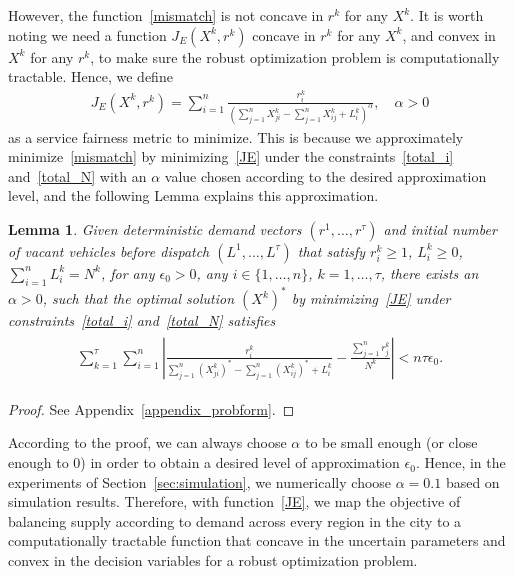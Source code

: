 \documentclass[10pt,twocolumn,twoside,english]{IEEEtran}
\newtheorem{lemma}{Lemma}
\begin{document}
However, the function~\eqref{mismatch} is not concave in $r^k$ for any $X^k$. It is worth noting we need a function $J_E (X^k, r^k) $ concave in $r^k$ for any $X^k$, and convex in $X^k$ for any $r^k$, to make sure the robust optimization problem is computationally tractable. Hence, we define
\begin{align}
J_E (X^k, r^k) = \sum_{i=1}^{n}\frac{r^k_i}{\left (\sum\limits_{j=1}^{n} X^k_{ji}-\sum\limits_{j=1}^{n} X^k_{ij} + L^k_i \right)^\alpha},\quad\alpha > 0
\label{JE}
\end{align}
as a service fairness metric to minimize. This is because we approximately minimize~\eqref{mismatch} by minimizing~\eqref{JE} under the constraints~\eqref{total_i} and~\eqref{total_N} with an $\alpha$ value chosen according to the desired approximation level, and the following Lemma explains this approximation.
\begin{lemma}
Given deterministic demand vectors $(r^1,\dots,r^{\tau})$ and initial number of vacant vehicles before dispatch $(L^1,\dots, L^{\tau})$ that satisfy $r^k_i \geqslant 1$, $L_i^k \geqslant 0$, $\sum_{i=1}^n L^k_i =N^k$, for any $\epsilon_0 >0$,  any $i\in\{1, \dots, n\}$, $k=1,\dots, \tau$, there exists an $\alpha>0$, such that the optimal solution $(X^k)^*$ by minimizing~\eqref{JE} under constraints~\eqref{total_i} and~\eqref{total_N} satisfies
\begin{align}
\begin{split}
\sum\limits_{k=1}^{\tau} \sum_{i=1}^{n}\left|\frac{r^k_i}{\sum\limits_{j=1}^{n} (X^k_{ji})^{*}-\sum\limits_{j=1}^{n} (X^k_{ij})^{*} + L^k_i}-\frac{\sum\limits_{j=1}^{n} r_j^k}{N^k}\right| < n \tau \epsilon_0.
\end{split}
\label{epsilon0_lemma}
\end{align}
\label{jematch}
\end{lemma}
\begin{proof}
See Appendix~\ref{appendix_probform}.
\end{proof}
According to the proof, we can always choose $\alpha$ to be small enough (or close enough to $0$) in order to obtain a desired level of approximation $\epsilon_0$. Hence, in the experiments of Section~\ref{sec:simulation}, we numerically choose $\alpha=0.1$ based on simulation results. Therefore, with function~\eqref{JE}, we map the objective of balancing supply according to demand across every region in the city to a computationally tractable function that concave in the uncertain parameters and convex in the decision variables for a robust optimization problem. 
\end{document}
